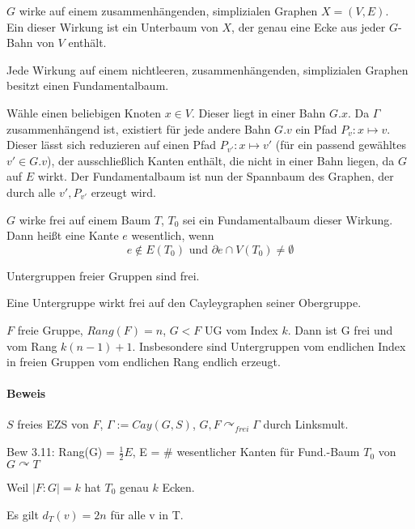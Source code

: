 \documentclass{article}
\begin{document}
$G$ wirke auf einem zusammenhängenden, simplizialen Graphen $X = (V,E)$.\\
Ein  dieser Wirkung ist ein Unterbaum von $X$, der genau eine Ecke aus jeder $G$-Bahn von $V$ enthält.

\Satz{}
Jede Wirkung auf einem nichtleeren, zusammenhängenden, simplizialen Graphen besitzt einen Fundamentalbaum.

\begin{Beweis}{}
Wähle einen beliebigen Knoten $x \in V$. Dieser liegt in einer Bahn $G.x$. Da $\Gamma$ zusammenhängend ist, existiert für jede andere Bahn $G.v$ ein Pfad $P_v : x \mapsto v$. Dieser lässt sich reduzieren auf einen Pfad $P_{v'} : x \mapsto v'$ (für ein passend gewähltes  $v' \in G.v$), der ausschließlich Kanten enthält, die nicht in einer Bahn liegen, da $G$ auf $E$ wirkt. Der Fundamentalbaum ist nun der Spannbaum des Graphen, der durch alle $v', P_{v'}$ erzeugt wird. 
\end{Beweis}

\Def{}
$G$ wirke frei auf einem Baum $T$, $T_0$ sei ein Fundamentalbaum dieser Wirkung. Dann heißt eine Kante $e$ wesentlich, wenn
\[ e \notin E(T_0) \text{ und } \partial{e} \cap V(T_0) \neq \emptyset \]




Untergruppen freier Gruppen sind frei.
\begin{Beweis}{}
Eine Untergruppe wirkt frei auf den Cayleygraphen seiner Obergruppe.
\end{Beweis}

 $F$ freie Gruppe, $Rang(F) = n$, $G < F$ UG vom Index $k$. Dann ist G frei und vom Rang $k(n-1) + 1$. Insbesondere sind Untergruppen vom endlichen Index in freien Gruppen vom endlichen Rang endlich erzeugt.
\paragraph{Beweis} $S$ freies EZS von $F$, $\Gamma:= Cay(G,S)$, $G,F \curvearrowright_{frei} \Gamma$ durch Linksmult.

Bew 3.11: Rang(G) = $\frac{1}{2} E$, E = \# wesentlicher Kanten für Fund.-Baum $T_0$ von $G \curvearrowright T$

Weil $|F:G| = k$ hat $T_0$ genau $k$ Ecken.

Es gilt $d_T(v) = 2n$ für alle v in T.
\end{document}
